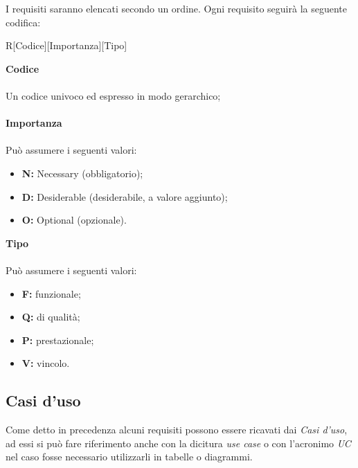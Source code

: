 \documentclass[a4paper]{report}
\begin{document}
	I requisiti saranno elencati secondo un ordine. Ogni requisito seguirà la seguente codifica: \\
	\begin{center}
		R[Codice][Importanza][Tipo]
	\end{center}
	\textbf{Codice} \\ \\ Un codice univoco ed espresso in modo gerarchico;\\ \\
	\textbf{Importanza} \\ \\Può assumere i seguenti valori:
	\begin{itemize}
		\item \textbf{N:} Necessary (obbligatorio);
		\item \textbf{D:} Desiderable (desiderabile, a valore aggiunto);
		\item \textbf{O:} Optional (opzionale).
	\end{itemize}
	\textbf{Tipo} \\ \\Può assumere i seguenti valori:
	\begin{itemize}
		\item \textbf{F:} funzionale;
		\item \textbf{Q:} di qualità;
		\item \textbf{P:} prestazionale;
		\item \textbf{V:} vincolo.
	\end{itemize}
	\subsection{Casi d'uso}
		Come detto in precedenza alcuni requisiti possono essere ricavati dai \emph{Casi d'uso}, ad essi si 
		può fare riferimento anche con la dicitura \emph{use case} o con l'acronimo \emph{UC} nel caso 
		fosse  necessario utilizzarli in tabelle o diagrammi. 
		 
\end{document}
